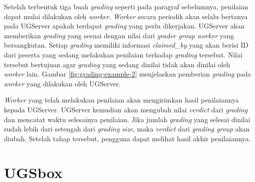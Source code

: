 \par Setelah terbentuk tiga buah \textit{grading} seperti pada paragraf sebelumnya, penilaian dapat mulai dilakukan oleh \textit{worker}. \textit{Worker} secara periodik akan selalu bertanya pada UGServer apakah terdapat \textit{grading} yang perlu dikerjakan. UGServer akan memberikan \textit{grading} yang sesuai dengan nilai dari \textit{grader group} \textit{worker} yang bersangkutan. Setiap \textit{grading} memiliki informasi \textit{claimed\_by} yang akan berisi ID dari peserta yang sedang melakukan penilaian terhadap \textit{grading} tersebut. Nilai tersebut bertujuan agar \textit{grading} yang sedang dinilai tidak akan dinilai oleh \textit{worker} lain. Gambar \ref{fig:grading-example-2} menjelaskan pemberian \textit{grading} pada \textit{worker} yang dilakukan oleh UGServer.

\par \textit{Worker} yang telah melakukan penilaian akan mengirimkan hasil penilaiannya kepada UGServer. UGServer kemudian akan mengubah nilai \textit{verdict} dari \textit{grading} dan mencatat waktu selesainya penilaian. Jika jumlah \textit{grading} yang selesai dinilai sudah lebih dari setengah dari \textit{grading size}, maka \textit{verdict} dari \textit{grading group} akan diubah. Setelah tahap tersebut, pengguna dapat melihat hasil akhir penilaiannya. 





\section{UGSbox}


